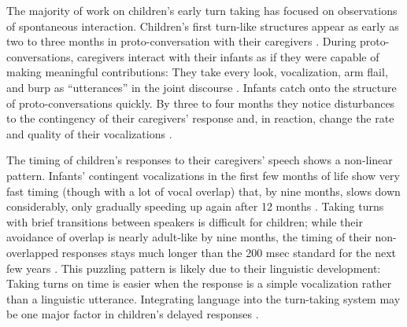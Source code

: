 \documentclass[authoryear, 12pt]{elsarticle}
\begin{document}
The majority of work on children's early turn taking has focused on observations of spontaneous interaction. Children's first turn-like structures appear as early as two to three months in proto-conversation with their caregivers \citep{bruner1975, bruner1985}. During proto-conversations, caregivers interact with their infants as if they were capable of making meaningful contributions: They take every look, vocalization, arm flail, and burp as ``utterances'' in the joint discourse \citep{bateson1975, jaffe2001, snow1977}. Infants catch onto the structure of proto-conversations quickly. By three to four months they notice disturbances to the contingency of their caregivers' response and, in reaction, change the rate and quality of their vocalizations \citep{k-bloom1988, masataka1993}. 


The timing of children's responses to their caregivers' speech shows a non-linear pattern. Infants' contingent vocalizations in the first few months of life show very fast timing (though with a lot of vocal overlap) that, by nine months, slows down considerably, only gradually speeding up again after 12 months \citep{hilbrink2015}. Taking turns with brief transitions between speakers is difficult for children; while their avoidance of overlap is nearly adult-like by nine months, the timing of their non-overlapped responses stays much longer than the 200 msec standard for the next few years \citep{casillas2016, garvey1984, ervin-tripp1979}. This puzzling pattern is likely due to their linguistic development: Taking turns on time is easier when the response is a simple vocalization rather than a linguistic utterance. Integrating language into the turn-taking system may be one major factor in children's delayed responses \citep{casillas2016}.
\end{document}
